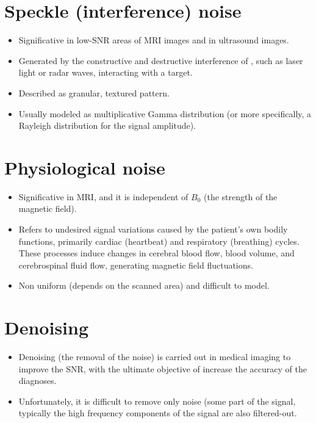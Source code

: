 \section{Speckle (interference) noise}
\begin{itemize}
\item Significative in low-SNR areas of \gls{MRI} images and in ultrasound images.
\item Generated by the constructive and destructive interference of
  , such as laser light or
  radar waves, interacting with a target.
\item Described as granular, textured pattern.
\item Usually modeled as multiplicative Gamma distribution (or more
  specifically, a Rayleigh distribution
  \cite{wikipedia_Rayleigh_distribution} for the signal amplitude).
\end{itemize}

\section{Physiological noise \cite{scarciglia2023physiological}}
\begin{itemize}
\item Significative in \gls{MRI}, and it is independent of $B_0$ (the
  strength of the magnetic field).
\item Refers to undesired signal variations caused by the patient's
  own bodily functions, primarily cardiac (heartbeat) and respiratory
  (breathing) cycles. These processes induce changes in cerebral blood
  flow, blood volume, and cerebrospinal fluid flow, generating
  magnetic field fluctuations.
\item Non uniform (depends on the scanned area) and difficult to model.
\end{itemize}

\section{Denoising \cite{buades2005review}}
\begin{itemize}
\item Denoising (the removal of the noise) is carried out in
  medical imaging to improve the \gls{SNR}, with the ultimate
  objective of increase the accuracy of the diagnoses.
\item Unfortunately, it is difficult to remove only noise (some part
  of the signal, typically the high frequency components of the signal
  are also filtered-out.
\end{itemize}

